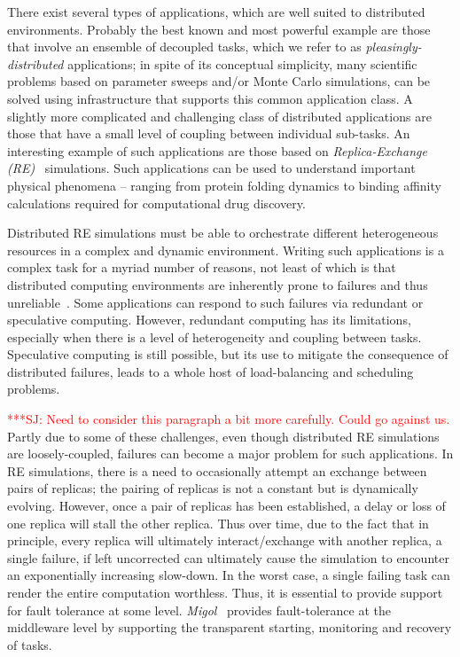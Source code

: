 \documentclass{rspublic}
\newcommand{\jhanote}[1]{ {\textcolor{red} { ***SJ: #1 }}}
\newcommand{\jhanote}[1]{}
\begin{document}
There exist several types of applications, which are well suited
to distributed environments. Probably the best known and most powerful
example are those that involve an ensemble of decoupled tasks, which
we refer to as {\it pleasingly-distributed} applications; in spite of
its conceptual simplicity, many scientific problems based on parameter
sweeps and/or Monte Carlo simulations, can be solved using
infrastructure that supports this common application class. A slightly
more complicated and challenging class of distributed applications are
those that have a small level of coupling between individual
sub-tasks.  An interesting example of such applications are those
based on \emph{Replica-Exchange (RE)}~\citep{hansmann,Sugita:1999rm}
simulations.  Such applications can be used to understand important
physical phenomena -- ranging from protein folding dynamics to binding
affinity calculations required for computational drug discovery.

Distributed RE simulations must be able to orchestrate different
heterogeneous resources in a complex and dynamic environment.  Writing
such applications is a complex task for a myriad number of reasons,
not least of which is that distributed computing environments are
inherently prone to failures and thus
unreliable~\citep{schroeder,10.1109/E-SCIENCE.2006.93,DBLP:conf/grid/KhaliliHOSC06}.
Some applications can respond to such failures via redundant or
speculative computing.  However, redundant computing has its
limitations, especially when there is a level of heterogeneity and
coupling between tasks.  Speculative computing is still possible, but
its use to mitigate the consequence of distributed failures, leads to
a whole host of load-balancing and scheduling problems.

\jhanote{Need to consider this paragraph a bit more carefully. Could
  go against us.} Partly due to some of these challenges, even though
distributed RE simulations are loosely-coupled, failures can become a
major problem for such applications.  In RE simulations, there is a
need to occasionally attempt an exchange between pairs of replicas;
the pairing of replicas is not a constant but is dynamically evolving.
However, once a pair of replicas has been established, a delay or loss
of one replica will stall the other replica.  Thus over time, due to
the fact that in principle, every replica will ultimately
interact/exchange with another replica, a single failure, if left
uncorrected can ultimately cause the simulation to encounter an
exponentially increasing slow-down.  In the worst case, a single
failing task can render the entire computation worthless.  Thus, it is
essential to provide support for fault tolerance at some level.
\emph{Migol}~\citep{schnorLuckow08} provides fault-tolerance at the
middleware level by supporting the transparent starting, monitoring
and recovery of tasks.
\end{document}
